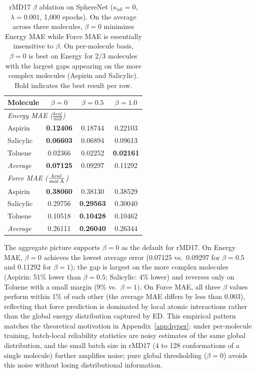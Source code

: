 \begin{table}[!htb]
  \scriptsize
  \centering
  \caption{rMD17 $\beta$ ablation on SphereNet ($\kappa_{all}\!=\!0$, $\lambda\!=\!0.001$, 1{,}000 epochs). On the average across three molecules, $\beta\!=\!0$ minimizes Energy MAE while Force MAE is essentially insensitive to $\beta$. On per-molecule basis, $\beta\!=\!0$ is best on Energy for 2/3 molecules with the largest gaps appearing on the more complex molecules (Aspirin and Salicylic). Bold indicates the best result per row.}
  \label{tab:rmd17_beta_ablation}
    \begin{tabular}{lccc}
    \toprule
    \textbf{Molecule} & $\beta\!=\!0$ & $\beta\!=\!0.5$ & $\beta\!=\!1.0$ \\
    \midrule
    \multicolumn{4}{l}{\textit{Energy MAE ($\frac{kcal}{mol}$)}} \\
    Aspirin       & \textbf{0.12406} & 0.18744 & 0.22103 \\
    Salicylic     & \textbf{0.06603} & 0.06894 & 0.09613 \\
    Toluene       & 0.02366 & 0.02252 & \textbf{0.02161} \\
    \emph{Average} & \textbf{0.07125} & 0.09297 & 0.11292 \\
    \midrule
    \multicolumn{4}{l}{\textit{Force MAE ($\frac{kcal}{mol\cdot \text{\r{A}}}$)}} \\
    Aspirin       & \textbf{0.38060} & 0.38130 & 0.38529 \\
    Salicylic     & 0.29756 & \textbf{0.29563} & 0.30040 \\
    Toluene       & 0.10518 & \textbf{0.10428} & 0.10462 \\
    \emph{Average} & 0.26111 & \textbf{0.26040} & 0.26344 \\
    \bottomrule
    \end{tabular}
\end{table}

The aggregate picture supports $\beta\!=\!0$ as the default for rMD17. On Energy MAE, $\beta\!=\!0$ achieves the lowest average error (0.07125 vs.\ 0.09297 for $\beta\!=\!0.5$ and 0.11292 for $\beta\!=\!1$); the gap is largest on the more complex molecules (Aspirin: 51\% lower than $\beta\!=\!0.5$; Salicylic: 4\% lower) and reverses only on Toluene with a small margin (9\% vs.\ $\beta\!=\!1$). On Force MAE, all three $\beta$ values perform within 1\% of each other (the average MAE differs by less than 0.003), reflecting that force prediction is dominated by local atomic interactions rather than the global energy distribution captured by ED. This empirical pattern matches the theoretical motivation in Appendix~\ref{app:hyper}: under per-molecule training, batch-local reliability statistics are noisy estimates of the same global distribution, and the small batch size in rMD17 (4 to 128 conformations of a single molecule) further amplifies noise; pure global thresholding ($\beta\!=\!0$) avoids this noise without losing distributional information.


